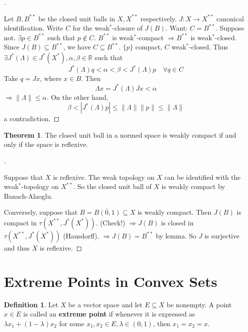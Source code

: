 \documentclass{article}
\theoremstyle{definition}
\newtheorem{thm}{Theorem}
\newtheorem{dfn}{Definition}
\newenvironment{proofs}[1][\proofname]{%
  \begin{proof}[#1]$ $\par\nobreak\ignorespaces
}{%
  \end{proof}
}
\newcommand{\RR}{\mathbb R}
\newcommand{\Ra}{\Rightarrow}
\begin{document}
\begin{proofs}
	Let $B, B^{**}$ be the closed unit balls in $X, X^{**}$ respectively.
	$J: X \to X^{**}$ canonical identification.
	Write $C$ for the weak$^*$-closure of $J(B)$.
	Want: $C = B^{**}$.
	Suppose not.
	$\exists p \in B^{**}$ such that $p \notin C$.
	$B^{**}$ is weak$^*$-compact $\Ra B^{**}$ is weak$^*$-closed.
	Since $J(B) \subseteq B^{**}$, we have $C \subseteq B^{**}$.
	$\{p\}$ compact, $C$ weak$^*$-closed.
	Thus $\exists J^*(\Lambda) \in J^*(X^*), \alpha, \beta \in \RR$ such that
	\[
		J^*(\Lambda) q < \alpha < \beta < J^*(\Lambda) p \quad \forall q \in C
	\]
	Take $q = Jx$, where $x \in B$.
	Then
	\[
		\Lambda x = J^*(\Lambda) J x < \alpha
	\]
	$\Ra \|\Lambda\| \leq \alpha$.
	On the other hand, 
	\[
		\beta < |J^*(\Lambda) p| \leq \|\Lambda\| \|p\| \leq \|\Lambda\|
	\]
	a contradiction.
\end{proofs}

\begin{thm}
	The closed unit ball in a normed space is weakly compact if and only if the space is reflexive.
\end{thm}

\begin{proofs}
	Suppose that $X$ is reflexive.
	The weak topology on $X$ can be identified with the weak$^*$-topology on $X^{**}$.
	So the closed unit ball of $X$ is weakly compact by Banach-Alaoglu.
	
	\par Conversely, suppose that $B = \overline{B(0, 1)} \subseteq X$ is weakly compact.
	Then $J(B)$ is compact in $\tau(X^{**}, J^*(X^*))$. (Check!)
	$\Ra J(B)$ is closed in $\tau(X^{**}, J^*(X^*))$ (Hausdorff).
	$\Ra J(B) = B^{**}$ by lemma.
	So $J$ is surjective and thus $X$ is reflexive.
\end{proofs}

\section{Extreme Points in Convex Sets}

\begin{dfn}
	Let $X$ be a vector space and let $E \subseteq X$ be nonempty.
	A point $x \in E$ is called an \textbf{extreme point} if whenever it is expressed as $\lambda x_1 + (1 - \lambda) x_2$ for some $x_1, x_2 \in E, \lambda \in (0, 1)$, then $x_1 = x_2 = x$.	
\end{dfn}
\end{document}
